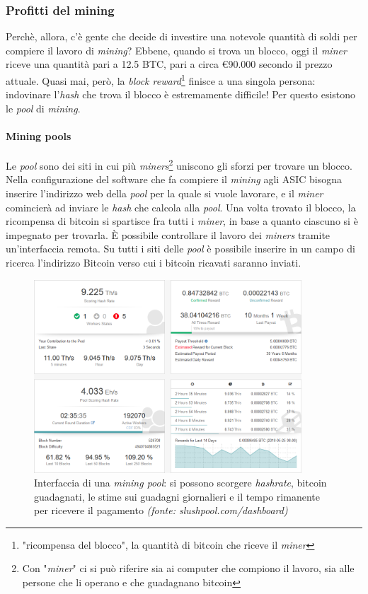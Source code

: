 \documentclass {article}
\begin{document}
\subsubsection {Profitti del mining}

Perchè, allora, c'è gente che decide di investire una notevole quantità di soldi per compiere il lavoro di \textit{mining}?
Ebbene, quando si trova un blocco, oggi il \textit{miner} riceve una quantità pari a 12.5 BTC, pari a circa \euro{90.000} secondo il prezzo attuale.
Quasi mai, però, la \textit{block reward}\footnote{"ricompensa del blocco", la quantità di bitcoin che riceve il \textit{miner}} finisce a una singola persona: indovinare l'\textit{hash} che trova il blocco è estremamente difficile!
Per questo esistono le \textit{pool} di \textit{mining}.

\paragraph {Mining pools}

Le \textit{pool} sono dei siti in cui più \textit{miners}\footnote{Con "\textit{miner}" ci si può riferire sia ai computer che compiono il lavoro, sia alle persone che li operano e che guadagnano bitcoin} uniscono gli sforzi per trovare un blocco.
Nella configurazione del software che fa compiere il \textit{mining} agli ASIC bisogna inserire l'indirizzo web della \textit{pool} per la quale si vuole lavorare, e il \textit{miner} comincierà ad inviare le \textit{hash} che calcola alla \textit{pool}.
Una volta trovato il blocco, la ricompensa di bitcoin si spartisce fra tutti i \textit{miner}, in base a quanto ciascuno si è impegnato per trovarla.
È possibile controllare il lavoro dei \textit{miners} tramite un'interfaccia remota. Su tutti i siti delle \textit{pool} è possibile inserire in un campo di ricerca l'indirizzo Bitcoin verso cui i bitcoin ricavati saranno inviati.

\vspace {0.5cm}
\begin{figure}[htb!]
\includegraphics [width = 10cm] {dashboard.png}
\centering
\caption {Interfaccia di una \textit{mining pool}: si possono scorgere \textit{hashrate}, bitcoin guadagnati, le stime sui guadagni giornalieri e il tempo rimanente per ricevere il pagamento \textit{(fonte: slushpool.com/dashboard)}}
\end{figure}
\vspace {0.2cm}
\end{document}
